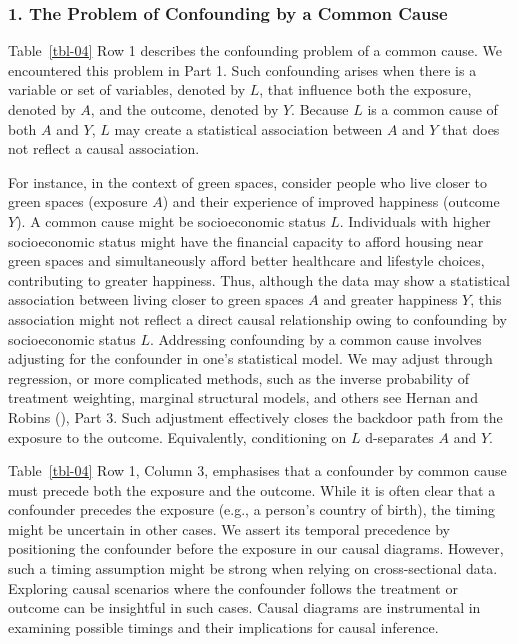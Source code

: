 \documentclass[
  singlecolumn]{article}
\begin{document}
\subsubsection{1. The Problem of Confounding by a Common
Cause}\label{the-problem-of-confounding-by-a-common-cause}

Table~\ref{tbl-04} Row 1 describes the confounding problem of a common
cause. We encountered this problem in Part 1. Such confounding arises
when there is a variable or set of variables, denoted by \(L\), that
influence both the exposure, denoted by \(A\), and the outcome, denoted
by \(Y.\) Because \(L\) is a common cause of both \(A\) and \(Y\), \(L\)
may create a statistical association between \(A\) and \(Y\) that does
not reflect a causal association.

For instance, in the context of green spaces, consider people who live
closer to green spaces (exposure \(A\)) and their experience of improved
happiness (outcome \(Y\)). A common cause might be socioeconomic status
\(L\). Individuals with higher socioeconomic status might have the
financial capacity to afford housing near green spaces and
simultaneously afford better healthcare and lifestyle choices,
contributing to greater happiness. Thus, although the data may show a
statistical association between living closer to green spaces \(A\) and
greater happiness \(Y\), this association might not reflect a direct
causal relationship owing to confounding by socioeconomic status \(L\).
Addressing confounding by a common cause involves adjusting for the
confounder in one's statistical model. We may adjust through regression,
or more complicated methods, such as the inverse probability of
treatment weighting, marginal structural models, and others see Hernan
and Robins (), Part 3. Such
adjustment effectively closes the backdoor path from the exposure to the
outcome. Equivalently, conditioning on \(L\) d-separates \(A\) and
\(Y\).

Table~\ref{tbl-04} Row 1, Column 3, emphasises that a confounder by
common cause must precede both the exposure and the outcome. While it is
often clear that a confounder precedes the exposure (e.g., a person's
country of birth), the timing might be uncertain in other cases. We
assert its temporal precedence by positioning the confounder before the
exposure in our causal diagrams. However, such a timing assumption might
be strong when relying on cross-sectional data. Exploring causal
scenarios where the confounder follows the treatment or outcome can be
insightful in such cases. Causal diagrams are instrumental in examining
possible timings and their implications for causal inference.
\end{document}

